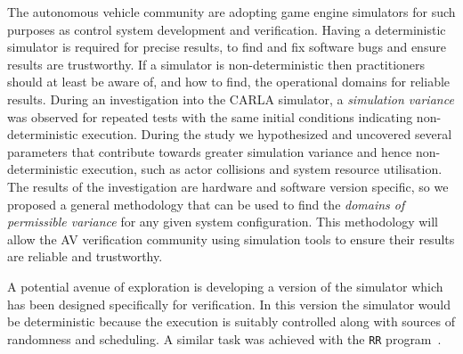 \documentclass[letterpaper, 10 pt, journal, twoside]{IEEEtran}
\begin{document}

The autonomous vehicle community are adopting game engine simulators for such purposes as control system development and verification. 
%
Having a deterministic simulator is required for precise results, 
%
to find and fix software bugs and ensure results are trustworthy. 
%
If a simulator is non-deterministic then practitioners should at least be aware of, and how to find, the operational domains for reliable results. During an investigation into the CARLA simulator, a \textit{simulation variance} was observed for repeated tests with the same initial conditions indicating non-deterministic execution. 
%
During the study we hypothesized and uncovered several parameters that contribute towards greater simulation variance and hence non-deterministic execution, such as actor collisions and system resource utilisation. 
%
The results of the investigation are hardware and software version specific, so we proposed a general methodology that can be used to find the \textit{domains of permissible variance} for any given system configuration. 
%
This methodology will allow the AV verification community using simulation tools to ensure their results are reliable and trustworthy.

A potential avenue of exploration is developing a version of the simulator which has been designed specifically for verification. In this version the simulator would be deterministic because the execution is suitably controlled along with sources of randomness and scheduling. A similar task was achieved with the \texttt{RR} program~\cite{RR_link}. 
\end{document}
